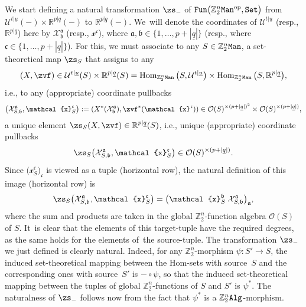 \documentclass[pdftex]{sigma}%
\newcommand{\op}[1]{\operatorname{#1}}
\newcommand{\R}{{\mathbb R}}
\newcommand{\Z}{{\mathbb Z}}
\def\ul{\underline}
\def\cO{\mathcal{O}}
\def\ul{\underline}
\newcommand{\0}{\otimes}
\newcommand{\z}{\Z_2^n}
\numberwithin{equation}{section}
\begin{document}
We start defining a natural transformation $\zs_-$ of ${\tt Fun}\big(\z{\tt Man}^{\op{op}},{\tt Set}\big)$ from $\mathcal{U}^{t|\ul u}(-)\times\R^{p|\ul q}(-)$ to $\R^{p|\ul q}(-)$. We~will denote the coordinates of $\mathcal{U}^{t|\ul u}$ (resp., $\R^{p|\ul q}$) here by $\mathcal{X}^{\mathfrak{a}}_\mathfrak{b}$ (resp., $\mathcal{x}^{\mathfrak{c}}$), where $\mathfrak{a},\mathfrak{b}\in\{1,\dots,p+|\ul q|\}$ (resp., where $\mathfrak{c}\in\{1,\dots,p+|\ul q|\}$). For this, we must associate to any $S\in\z{\tt Man}$, a set-theoretical map $\zs_S$ that assigns to any
\[
(X,\zvf)\in\mathcal{U}^{t|\ul u}(S)\times\R^{p|\ul q}(S)=\op{Hom}_{\z{\tt Man}}\big(S,\mathcal{U}^{t|\ul u}\big)\times\op{Hom}_{\z{\tt Man}}\big(S,\R^{p|\ul q}\big),
\]
i.e., to any (appropriate) coordinate pullbacks
\begin{gather}\label{CoorPull}
\big(\mathcal{X}^\mathfrak{a}_{S,\mathfrak{b}},\mathcal{x}_S^{\mathfrak{c}}\big):= (X^*(\mathcal{X}^\mathfrak{a}_{\mathfrak{b}}),\zvf^*(\mathcal{x}^{\mathfrak{c}}))
\in\cO(S)^{\times (p+|\ul q|)^2}\times\cO(S)^{\times(p+|\ul q|)},
\end{gather}
a unique element $\zs_S(X,\zvf)\in\R^{p|\ul q}(S)$, i.e., unique (appropriate) coordinate pullbacks
\[
\zs_S\big(\mathcal{X}^\mathfrak{a}_{S,\mathfrak{b}},\mathcal{x}_S^{\mathfrak{c}}\big)\in\cO(S)^{\times(p+|\ul q|)}.
\]
Since $\big(\mathcal{x}_S^{\mathfrak{c}}\big)_{\mathfrak{c}}$ is viewed as a tuple (horizontal row), the natural definition of this image (horizontal row) is
\begin{gather}\label{NatTraCanAct}
\zs_S\big(\mathcal{X}^\mathfrak{a}_{S,\mathfrak{b}},\mathcal{x}_S^{\mathfrak{c}}\big) =\big(\mathcal{x}_S^{\mathfrak{b}}\;\mathcal{X}^{\mathfrak{a}}_{S,\mathfrak{b}}\big)_\mathfrak{a},
\end{gather}
where the sum and products are taken in the global $\z$-function algebra $\cO(S)$ of $S$. It~is clear that the elements of this target-tuple have the required degrees, as the same holds for the elements of~the source-tuple. The transformation $\zs_-$ we just defined is clearly natural. Indeed, for any $\z$-morphism $\psi\colon S'\to S$, the induced set-theoretical mapping between the Hom-sets with source~$S$ and the corresponding ones with source~$S'$ is $-\circ \psi$, so that the induced set-theoretical mapping between the tuples of global $\z$-functions of $S$ and $S'$ is $\psi^*$. The naturalness of $\zs_-$ follows now from the fact that $\psi^*$ is a $\z{\tt Alg}$-morphism.
\end{document}
